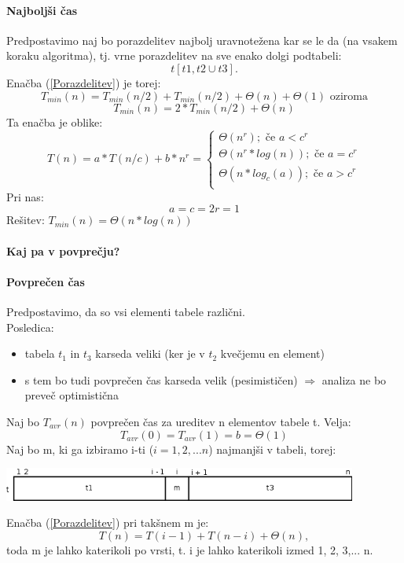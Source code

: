 \documentclass[a4paper,10pt]{article}
\begin{document}
\paragraph{Najbolj\v si \v cas}
Predpostavimo naj bo porazdelitev najbolj uravnote\v zena kar se le da (na vsakem koraku algoritma), tj. vrne porazdelitev na sve enako dolgi podtabeli:
$$t[t1, t2 \cup t3].$$
Ena\v cba (\ref{Porazdelitev}) je torej:
$$T_{min}(n)=T_{min}(n/2) + T_{min}(n/2) + \Theta (n)+\Theta (1) \mbox{ oziroma}$$
$$T_{min}(n)=2 * T_{min}(n/2) + \Theta (n)$$
Ta ena\v cba je oblike:
$$
T(n)=a * T(n/c) + b*n^r =
\left\lbrace 
\begin{array}{l}
\Theta (n^r); \mbox{ \v ce } a<c^r \\
\Theta (n^r*log(n)); \mbox{ \v ce } a=c^r \\
\Theta (n*log_c(a)); \mbox{ \v ce } a>c^r \\
\end{array}
\right.
$$
Pri nas:
$$
a=c=2
r=1
$$
Re\v sitev: $T_{min}(n) = \Theta (n*log(n))$\\
\\
\textbf{Kaj pa v povpre\v cju?}

\paragraph{Povpre\v cen \v cas}
Predpostavimo, da so vsi elementi tabele razli\v cni.\\
Posledica:
\begin{itemize}
\item tabela $t_1$ in $t_3$ karseda veliki (ker je v $t_2$ kve\v cjemu en element)
\item s tem bo tudi povpre\v cen \v cas karseda velik (pesimisti\v cen) $\Rightarrow$ analiza ne bo preve\v c optimisti\v cna
\end{itemize}
Naj bo $T_{avr}(n)$ povpre\v cen \v cas za ureditev n elementov tabele t. Velja:
$$
T_{avr}(0) = T_{avr}(1) = b = \Theta (1)
$$
Naj bo m, ki ga izbiramo i-ti ($i = 1,2,... n$) najmanj\v si v tabeli, torej:
	\begin{center}
	\includegraphics[width=11.65cm,height=1.1cm]{Slike/QuickSortTabela.png}
	\end{center}
Ena\v cba (\ref{Porazdelitev}) pri tak\v snem m je:
$$
T(n) = T(i-1) + T(n-i) + \Theta(n),
$$
toda m je lahko katerikoli po vrsti, t. i je lahko katerikoli izmed 1, 2, 3,... n.
\end{document}
